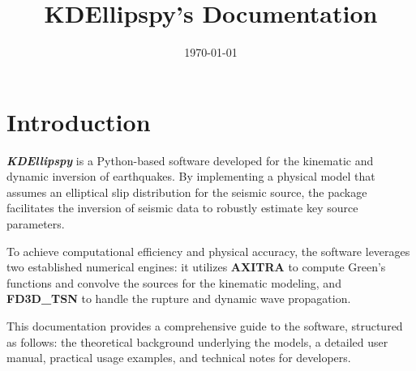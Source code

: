 \documentclass[11pt,a4paper]{report}
\title{KDEllipspy's Documentation}
\date{\today}
\begin{document}
\maketitle
\tableofcontents
\clearpage
\section*{Introduction}
\textit{\textbf{KDEllipspy}} is a Python-based software developed for the kinematic and dynamic inversion of earthquakes. By implementing a physical model that assumes an elliptical slip distribution for the seismic source, the package facilitates the inversion of seismic data to robustly estimate key source parameters.\par
To achieve computational efficiency and physical accuracy, the software leverages two established numerical engines: it utilizes \textbf{AXITRA} to compute Green's functions and convolve the sources for the kinematic modeling, and \textbf{FD3D\_TSN} to handle the rupture and dynamic wave propagation.\par
This documentation provides a comprehensive guide to the software, structured as follows: the theoretical background underlying the models, a detailed user manual, practical usage examples, and technical notes for developers.




\end{document}

